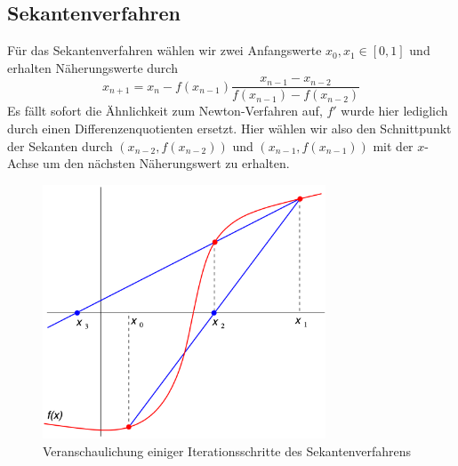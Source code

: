 \documentclass[a4paper,12pt]{article}
\newcommand{\1}{1\hspace{-0,9ex}1}
\begin{document}
\subsection*{Sekantenverfahren}
Für das Sekantenverfahren wählen wir zwei Anfangswerte $x_0,x_1 \in [0,1]$ und erhalten Näherungswerte durch
\[
	x_{n+1}= x_n - f(x_{n-1})\frac{x_{n-1}-x_{n-2}}{f(x_{n-1})-f(x_{n-2})}
\]
Es fällt sofort die Ähnlichkeit zum Newton-Verfahren auf, $f'$ wurde hier lediglich durch einen Differenzenquotienten ersetzt. Hier wählen wir also den Schnittpunkt der Sekanten durch $(x_{n-2}, f(x_{n-2}))$ und $(x_{n-1}, f(x_{n-1}))$ mit der $x$-Achse um den nächsten Näherungswert zu erhalten.
\begin{figure}[H]
	\centering
	\includegraphics[width=0.75\textwidth]{plots/sekant.png}
	\caption{Veranschaulichung einiger Iterationsschritte des Sekantenverfahrens}
\end{figure}
\end{document}
